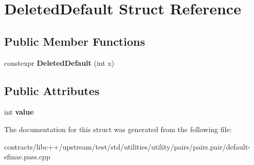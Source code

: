 \hypertarget{struct_deleted_default}{}\section{Deleted\+Default Struct Reference}
\label{struct_deleted_default}
\subsection*{Public Member Functions}
\begin{DoxyCompactItemize}
\item 
\mbox{\label{struct_deleted_default_a02c2535e7ceb4983d32f82827f0ab0af}} 
constexpr {\bfseries Deleted\+Default} (int x)
\end{DoxyCompactItemize}
\subsection*{Public Attributes}
\begin{DoxyCompactItemize}
\item 
\mbox{\label{struct_deleted_default_af95512427bd44407dd24190f3704a356}} 
int {\bfseries value}
\end{DoxyCompactItemize}


The documentation for this struct was generated from the following file\+:\begin{DoxyCompactItemize}
\item 
contracts/libc++/upstream/test/std/utilities/utility/pairs/pairs.\+pair/default-\/sfinae.\+pass.\+cpp\end{DoxyCompactItemize}
